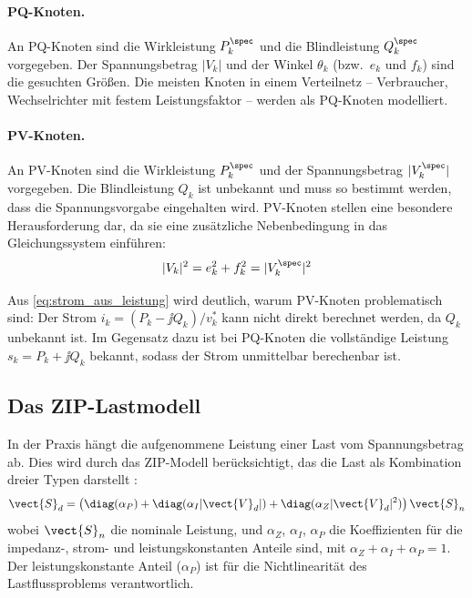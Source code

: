 \paragraph{PQ-Knoten.}
An PQ-Knoten sind die Wirkleistung $P_k^{\spec}$ und die Blindleistung $Q_k^{\spec}$ vorgegeben. Der Spannungsbetrag $|V_k|$ und der Winkel $\theta_k$ (bzw.\ $e_k$ und $f_k$) sind die gesuchten Größen. Die meisten Knoten in einem Verteilnetz -- Verbraucher, Wechselrichter mit festem Leistungsfaktor -- werden als PQ-Knoten modelliert.

\paragraph{PV-Knoten.}
An PV-Knoten sind die Wirkleistung $P_k^{\spec}$ und der Spannungsbetrag $|V_k^{\spec}|$ vorgegeben. Die Blindleistung $Q_k$ ist unbekannt und muss so bestimmt werden, dass die Spannungsvorgabe eingehalten wird. PV-Knoten stellen eine besondere Herausforderung dar, da sie eine zusätzliche Nebenbedingung in das Gleichungssystem einführen:
\begin{equation}
	|V_k|^2 = e_k^2 + f_k^2 = |V_k^{\spec}|^2
	\label{eq:pv_bedingung}
\end{equation}

Aus \eqref{eq:strom_aus_leistung} wird deutlich, warum PV-Knoten problematisch sind: Der Strom $i_k = (P_k - \jj Q_k)/v_k^*$ kann nicht direkt berechnet werden, da $Q_k$ unbekannt ist. Im Gegensatz dazu ist bei PQ-Knoten die vollständige Leistung $s_k = P_k + \jj Q_k$ bekannt, sodass der Strom unmittelbar berechenbar ist.

\subsection{Das ZIP-Lastmodell}
\label{subsec:zip}

In der Praxis hängt die aufgenommene Leistung einer Last vom Spannungsbetrag ab. Dies wird durch das ZIP-Modell berücksichtigt, das die Last als Kombination dreier Typen darstellt \cite{Giraldo2022}:
\begin{equation}
	\vect{S}_d = \left(\diag(\alpha_P) + \diag(\alpha_I |\vect{V}_d|) + \diag(\alpha_Z |\vect{V}_d|^2)\right) \vect{S}_n
	\label{eq:zip}
\end{equation}
wobei $\vect{S}_n$ die nominale Leistung, und $\alpha_Z$, $\alpha_I$, $\alpha_P$ die Koeffizienten für die impedanz-, strom- und leistungskonstanten Anteile sind, mit $\alpha_Z + \alpha_I + \alpha_P = 1$. Der leistungskonstante Anteil ($\alpha_P$) ist für die Nichtlinearität des Lastflussproblems verantwortlich.


